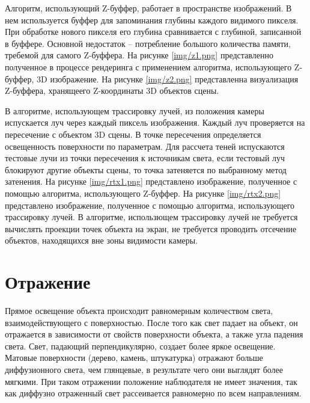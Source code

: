 Алгоритм, использующий Z-буффер, работает в пространстве изображений. В нем используется буффер для запоминания глубины каждого видимого пикселя. При обработке нового пикселя его глубина сравнивается с глубиной, записанной в буффере. Основной недостаток -- потребление большого количества памяти, требемой для самого Z-буффера. На рисунке \ref{img/z1.png} представленно полученное в процессе рендеринга с применением алгоритма, использующего Z-буффер, 3D изображение. На рисунке \ref{img/z2.png} представленна визуализация Z-буффера, хранящеего Z-координаты 3D объектов сцены. 



В алгоритме, использующем трассировку лучей, из положения камеры испускается луч через каждый пиксель изображения. Каждый луч проверяется на пересечение с объектом 3D сцены. В точке пересечения определяется освещенность поверхности по параметрам. Для рассчета теней испускаются тестовые лучи из точки пересечения к источникам света, если тестовый луч блокируют другие объекты сцены, то точка затеняется по выбранному метод затенения. На рисунке \ref{img/rtx1.png} представлено изображение, полученное с помощью алгоритма, использующего Z-буффер. На рисунке \ref{img/rtx2.png} представлено изображение, полученное с помощью алгоритма, использующего трассировку лучей. В алгоритме, использющем трассировку лучей не требуется вычислять проекции точек объекта на экран, не требуется проводить отсечение объектов, находящихся вне зоны видимости камеры.



\section{Отражение}
Прямое освещение объекта происходит равномерным количеством света, взаимодействующего с поверхностью. После того как свет падает на объект, он отражается в зависимости от свойств поверхности объекта, а также угла падения света. Свет, падающий перпендикулярно, создает более яркое освещение. Матовые поверхности (дерево, камень, штукатурка) отражают больше диффузионного света, чем глянцевые, в результате чего они выглядят более мягкими.
При таком отражении положение наблюдателя не имеет значения, так как диффузно отраженный свет рассеивается равномерно по всем направлениям.

